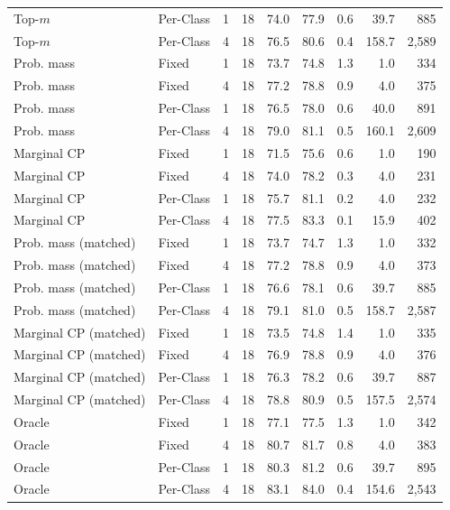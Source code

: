 \begin{tabular}{llrrrrrrr}
Top-$m$ & Per-Class & 1 & 18 & 74.0 & 77.9 & 0.6 & 39.7 & 885 \\
Top-$m$ & Per-Class & 4 & 18 & 76.5 & 80.6 & 0.4 & 158.7 & 2,589 \\
Prob. mass & Fixed & 1 & 18 & 73.7 & 74.8 & 1.3 & 1.0 & 334 \\
Prob. mass & Fixed & 4 & 18 & 77.2 & 78.8 & 0.9 & 4.0 & 375 \\
Prob. mass & Per-Class & 1 & 18 & 76.5 & 78.0 & 0.6 & 40.0 & 891 \\
Prob. mass & Per-Class & 4 & 18 & 79.0 & 81.1 & 0.5 & 160.1 & 2,609 \\
Marginal CP & Fixed & 1 & 18 & 71.5 & 75.6 & 0.6 & 1.0 & 190 \\
Marginal CP & Fixed & 4 & 18 & 74.0 & 78.2 & 0.3 & 4.0 & 231 \\
Marginal CP & Per-Class & 1 & 18 & 75.7 & 81.1 & 0.2 & 4.0 & 232 \\
Marginal CP & Per-Class & 4 & 18 & 77.5 & 83.3 & 0.1 & 15.9 & 402 \\
Prob. mass (matched) & Fixed & 1 & 18 & 73.7 & 74.7 & 1.3 & 1.0 & 332 \\
Prob. mass (matched) & Fixed & 4 & 18 & 77.2 & 78.8 & 0.9 & 4.0 & 373 \\
Prob. mass (matched) & Per-Class & 1 & 18 & 76.6 & 78.1 & 0.6 & 39.7 & 885 \\
Prob. mass (matched) & Per-Class & 4 & 18 & 79.1 & 81.0 & 0.5 & 158.7 & 2,587 \\
Marginal CP (matched) & Fixed & 1 & 18 & 73.5 & 74.8 & 1.4 & 1.0 & 335 \\
Marginal CP (matched) & Fixed & 4 & 18 & 76.9 & 78.8 & 0.9 & 4.0 & 376 \\
Marginal CP (matched) & Per-Class & 1 & 18 & 76.3 & 78.2 & 0.6 & 39.7 & 887 \\
Marginal CP (matched) & Per-Class & 4 & 18 & 78.8 & 80.9 & 0.5 & 157.5 & 2,574 \\
Oracle & Fixed & 1 & 18 & 77.1 & 77.5 & 1.3 & 1.0 & 342 \\
Oracle & Fixed & 4 & 18 & 80.7 & 81.7 & 0.8 & 4.0 & 383 \\
Oracle & Per-Class & 1 & 18 & 80.3 & 81.2 & 0.6 & 39.7 & 895 \\
Oracle & Per-Class & 4 & 18 & 83.1 & 84.0 & 0.4 & 154.6 & 2,543 \\
\bottomrule
\end{tabular}
